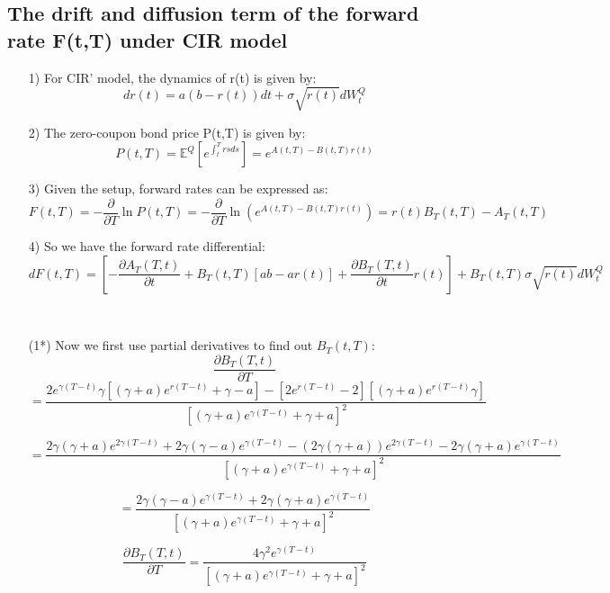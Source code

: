 \documentclass[14pt]{extarticle}
\begin{document}
\subsection{The drift and diffusion term of the forward rate F(t,T) under CIR model}
\begin{itemize}
    \item [1)]For CIR’ model, the dynamics of r(t) is given by:
    $$dr(t)=a(b-r(t))dt+\sigma \sqrt{r(t)} dW_t^Q        $$
    \item[2)]The zero-coupon bond price P(t,T) is given by:
    $$P(t,T)= \mathbb{E}^Q[e^{\int_t^T  rs ds}]=e^{A(t,T)-B(t,T)r(t)} $$
    \item[3)]Given the setup, forward rates can be expressed as:
   $$ F(t,T)= -\frac{ \partial }{ \partial T} \ln P(t,T) = -\frac{ \partial }{ \partial T} \ln{(e^{A(t,T)-B(t,T)r(t)})} =r(t)B_T(t,T)-A_T(t,T)                          $$
    \item[4)]So we have the forward rate differential:
    $$ dF(t,T)=[-\frac{ \partial A_T (T,t) }{ \partial t}+B_T(t,T)[ab-ar(t)] + \frac{ \partial B_T (T,t) }{ \partial t} r(t)   ]+B_T(t,T)\sigma \sqrt{r(t)}dW_t^Q           $$
\end{itemize}
~\\
\begin{itemize}
    \item[(1*)]Now we first use partial derivatives to find out $B_T(t,T) $:
    $$ \frac{ \partial B_T (T,t) }{ \partial T}$$
$$=\frac{ 2e^{\gamma (T-t)}\gamma [(\gamma+a)e^{r(T-t)}+\gamma-a  ]-[2e^{r(T-t)}-2][(\gamma+a)e^{r(T-t)}\gamma]    }   { [(\gamma+a) e^{\gamma(T-t)}+\gamma+a]^2 } $$

$$  =\frac{2\gamma(\gamma+a)e^{2\gamma(T-t)}+2\gamma(\gamma-a)e^{\gamma(T-t)}  -(2\gamma(\gamma+a)) e^{2\gamma(T-t)} -2\gamma(\gamma+a)e^{\gamma(T-t)} } {[(\gamma+a) e^{\gamma(T-t)}+\gamma+a]^2}     $$

$$ =\frac{2\gamma (\gamma-a)e^{\gamma(T-t)}+2\gamma (\gamma+a)  e^{\gamma(T-t)}} {[(\gamma+a) e^{\gamma(T-t)}+\gamma+a]^2}       $$

$$ \frac{ \partial B_T (T,t) }{ \partial T} =\frac{4\gamma^2 e^{\gamma(T-t)} } {[(\gamma+a) e^{\gamma(T-t)}+\gamma+a]^2} $$

\end{itemize}
~\\
\end{document}
